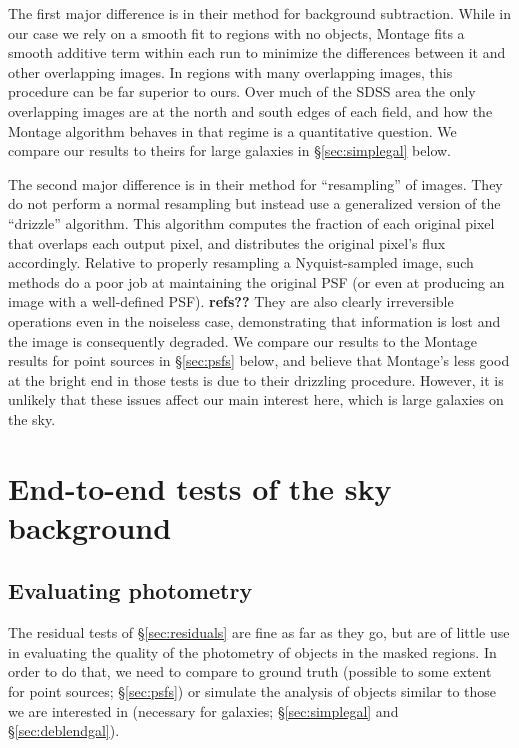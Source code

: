 \documentclass[10pt,preprint]{aastex}
\begin{document}
The first major difference is in their method for background
subtraction. While in our case we rely on a smooth fit to regions with
no objects, Montage fits a smooth additive term within each run to
minimize the differences between it and other overlapping images. In
regions with many overlapping images, this procedure can be far
superior to ours. Over much of the SDSS area the only overlapping
images are at the north and south edges of each field, and how the
Montage algorithm behaves in that regime is a quantitative
question. We compare our results to theirs for large galaxies in
\S\ref{sec:simplegal} below.

The second major difference is in their method for ``resampling'' of
images. They do not perform a normal resampling but instead use a
generalized version of the ``drizzle'' algorithm. This algorithm
computes the fraction of each original pixel that overlaps each output
pixel, and distributes the original pixel's flux accordingly. Relative
to properly resampling a Nyquist-sampled image, such methods do a poor
job at maintaining the original PSF (or even at producing an image
with a well-defined PSF). {\bf refs??} They are also clearly
irreversible operations even in the noiseless case, demonstrating that
information is lost and the image is consequently degraded. We compare
our results to the Montage results for point sources in
\S\ref{sec:psfs} below, and believe that Montage's less good
at the bright end in those tests is due to their drizzling
procedure. However, it is unlikely that these issues affect our main
interest here, which is large galaxies on the sky.

\section{End-to-end tests of the sky background}
\label{sec:endtoend}

\subsection{Evaluating photometry}
\label{sec:e2eintro}

The residual tests of \S\ref{sec:residuals} are fine as far as they go,
but are of little use in evaluating the quality of the photometry of
objects in the masked regions.  In order to do that, we need to
compare to ground truth (possible to some extent for point sources;
\S\ref{sec:psfs}) or simulate the analysis of objects similar to
those we are interested in (necessary for galaxies;
\S\ref{sec:simplegal} and \S\ref{sec:deblendgal}).
\end{document}
